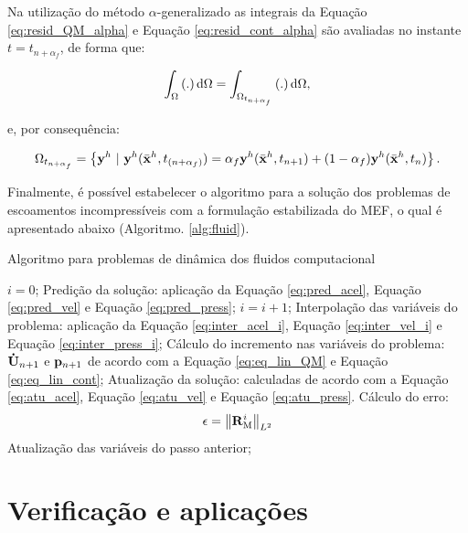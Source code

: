 Na utilização do método $\alpha$-generalizado as integrais da Equação \eqref{eq:resid_QM_alpha} e Equação \eqref{eq:resid_cont_alpha} são avaliadas no instante $t = t_{n+\alpha_{f}}$, de forma que:

\begin{align}
\int_{\Omega} \left(.\right) \mathrm{d} \Omega = \int_{\Omega_{t_{n+\alpha_{f}}}} \left(.\right) \mathrm{d} \Omega,
\end{align}

\noindent e, por consequência:

\begin{align}
\Omega_{t_{n+\alpha_{f}}} = \left\{\mathbf{y}^h \  |\  \mathbf{y}^h(\bar{\mathbf{x}}^h,t_{(n+\alpha_f)}) = \alpha_f \mathbf{y}^h(\bar{\mathbf{x}}^h,t_{n+1}) + (1-\alpha_f) \mathbf{y}^h(\bar{\mathbf{x}}^h,t_n)  \right\}.
\end{align}

Finalmente, é possível estabelecer o algoritmo para a solução dos problemas de escoamentos incompressíveis com a formulação estabilizada do MEF, o qual é apresentado abaixo (Algoritmo. \ref{alg:fluid}).

\begin{algorithm}
	\caption{Algoritmo para problemas de dinâmica dos fluidos computacional}
	\label{alg:fluid}
	\begin{algorithmic}[1]
		\State $i=0$;
		\State Predição da solução: aplicação da Equação \eqref{eq:pred_acel}, Equação \eqref{eq:pred_vel} e Equação \eqref{eq:pred_press};
		\State $i=i+1$;
		\State Interpolação das variáveis do problema: aplicação da Equação \eqref{eq:inter_acel_i}, Equação \eqref{eq:inter_vel_i} e Equação \eqref{eq:inter_press_i};
		\State Cálculo do incremento nas variáveis do problema: $\mathbf{\dot{U}}_{n+1}$ e $\mathbf{p}_{n+1}$ de acordo com a Equação \eqref{eq:eq_lin_QM} e Equação \eqref{eq:eq_lin_cont};
		\State Atualização da solução: calculadas de acordo com a Equação \eqref{eq:atu_acel}, Equação \eqref{eq:atu_vel} e Equação \eqref{eq:atu_press}.
		\State Cálculo do erro:
		\begin{align}
		\epsilon =\left\| \mathbf{R}_\mathrm{M}^i \right\|_{L^2}
		\end{align}
		\EndWhile
		\State Atualização das variáveis do passo anterior;
		\EndFor
	\end{algorithmic}
\end{algorithm}

\section{Verificação e aplicações} \label{capitulo:Cap2:VerApl}

